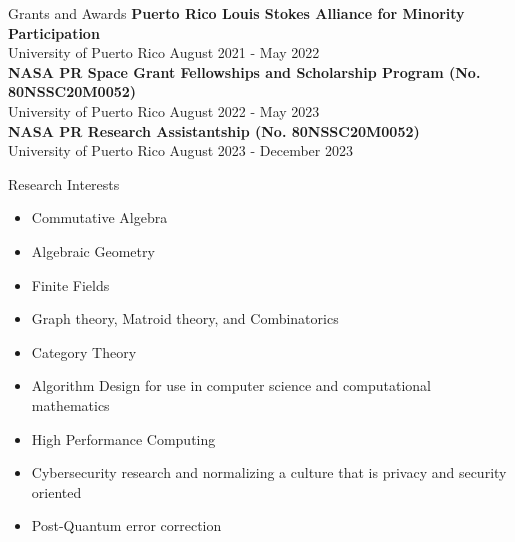\documentclass{resume} %
\begin{document}
\begin{rSection}{Grants and Awards}
    \textbf{Puerto Rico Louis Stokes Alliance for Minority Participation} \\
    University of Puerto Rico \hfill{August 2021 - May 2022} \\

    \textbf{NASA PR Space Grant Fellowships and Scholarship Program (No.
    80NSSC20M0052)} \\
    University of Puerto Rico \hfill{August 2022 - May 2023}    \\

    \textbf{NASA PR Research Assistantship (No.
    80NSSC20M0052)} \\
    University of Puerto Rico \hfill{August 2023 - December 2023}    \\

\end{rSection}


\begin{rSection}{Research Interests}
    \begin{multicols}{2}
      \begin{itemize}
        \item Commutative Algebra

        \item Algebraic Geometry

        \item Finite Fields

        \item Graph theory, Matroid theory, and Combinatorics

        \item Category Theory

        \item Algorithm Design for use in computer science and computational
            mathematics

        \item High Performance Computing

        \item Cybersecurity research and normalizing a culture that is privacy
            and security oriented

        \item Post-Quantum error correction
      \end{itemize}
    \end{multicols}
\end{rSection}
\end{document}
